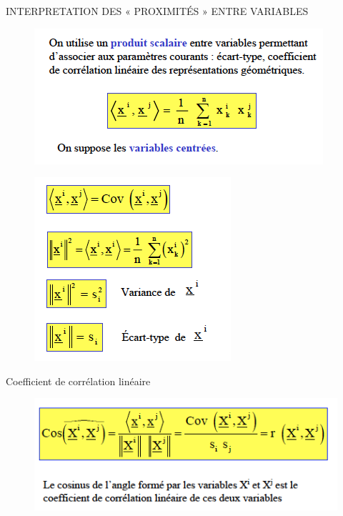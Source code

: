 \documentclass[11pt]{beamer}
\begin{document}
\begin{frame}{INTERPRETATION DES « PROXIMITÉS » ENTRE
VARIABLES}

\begin{figure}
\includegraphics[scale=0.6]{schema18.png} 
\end{figure}

\end{frame}


\begin{frame}

\begin{figure}
\includegraphics[scale=0.6]{schema19.png} 
\end{figure}

\end{frame}


\begin{frame}{Coefficient de corrélation linéaire}

\begin{figure}
\includegraphics[scale=0.6]{schema20.png} 
\end{figure}

\end{frame}
\end{document}
